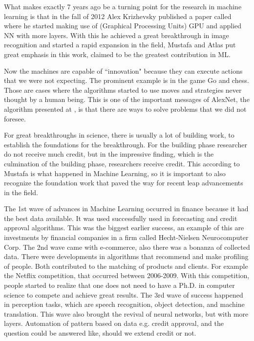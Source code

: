 \documentclass[9pt,a4paper]{article}
\begin{document}
What makes exactly 7 years ago be a turning point for the research in machine learning is that in the fall of 2012 Alex Krizhevsky published a paper called \cite{krizhevsky_etal_2012} where he started making use of (Graphical Processing Units) GPU and applied NN with more layers. With this he achieved a great breakthrough in image recognition and started a rapid expansion in the field, Mustafa and Atlas put great emphasis in this work, claimed to be the greatest contribution in ML. 

Now the machines are capable of  ``innovation" because they can execute actions that we were not expecting. 
The prominent example is in the game Go and chess. Those are cases where the algorithms started to use moves and strategies never thought by a human being. This is one of the important messages of AlexNet, the algorithm presented at \cite{krizhevsky_etal_2012}, is that there are ways to solve problems that we did not foresee.

For great breakthroughs in science, there is usually a lot of building work, to establish the foundations for the breakthrough.  For the building phase researcher do not receive much credit, but in the impressive finding, which is the culmination of the building phase, researchers receive credit. This according to Mustafa is what happened in Machine Learning, so it is important to also recognize the foundation work that paved the way for recent leap advancements in the field.

The 1st wave of advances in Machine Learning occurred in finance because it had the best data available. It was used successfully used in forecasting and credit approval algorithms.  This was the biggest earlier success, an example of this are investments by financial companies in a firm called Hecht-Nielsen Neurocomputer Corp. 
The 2nd wave came with e-commerce, also there was a bonanza of collected data. There were developments in algorithms that recommend and make profiling of people. Both contributed to the matching of products and clients. For example the Netflix competition, that occurred between 2006-2009. 
With this competition, people started to realize that one does not need to have a Ph.D. in computer science to compete and achieve great results.
The 3rd wave of success happened in perception tasks, which are speech recognition, object detection, and machine translation. This wave also brought the revival of neural networks, but with more layers. Automation of pattern based on data e.g. credit approval, and the question could be answered like, should we extend credit or not.
\end{document}

